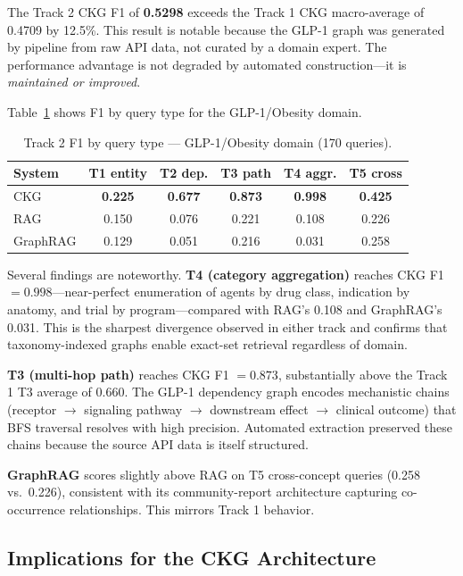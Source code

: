 The Track 2 CKG F1 of \textbf{0.5298} exceeds the Track 1 CKG
macro-average of 0.4709 by 12.5\%. This result is notable because the
GLP-1 graph was generated by pipeline from raw API data, not curated by
a domain expert. The performance advantage is not degraded by automated
construction---it is \textit{maintained or improved}.

Table~\ref{tab:track2-by-type} shows F1 by query type for the
GLP-1/Obesity domain.

\begin{table}[htbp]
\centering
\caption{Track 2 F1 by query type --- GLP-1/Obesity domain (170 queries).}
\label{tab:track2-by-type}
\begin{tabular}{lccccc}
\toprule
\textbf{System} & \textbf{T1 entity} & \textbf{T2 dep.} & \textbf{T3 path} &
  \textbf{T4 aggr.} & \textbf{T5 cross} \\
\midrule
CKG      & \textbf{0.225} & \textbf{0.677} & \textbf{0.873} & \textbf{0.998} & \textbf{0.425} \\
RAG      & 0.150 & 0.076 & 0.221 & 0.108 & 0.226 \\
GraphRAG & 0.129 & 0.051 & 0.216 & 0.031 & 0.258 \\
\bottomrule
\end{tabular}
\end{table}

Several findings are noteworthy. \textbf{T4 (category aggregation)} reaches
CKG F1 $= 0.998$---near-perfect enumeration of agents by drug class,
indication by anatomy, and trial by program---compared with RAG's 0.108
and GraphRAG's 0.031. This is the sharpest divergence observed in either
track and confirms that taxonomy-indexed graphs enable exact-set retrieval
regardless of domain.

\textbf{T3 (multi-hop path)} reaches CKG F1 $= 0.873$, substantially above
the Track 1 T3 average of 0.660. The GLP-1 dependency graph encodes
mechanistic chains (receptor $\to$ signaling pathway $\to$ downstream
effect $\to$ clinical outcome) that BFS traversal resolves with high
precision. Automated extraction preserved these chains because the
source API data is itself structured.

\textbf{GraphRAG} scores slightly above RAG on T5 cross-concept queries
(0.258 vs.\ 0.226), consistent with its community-report architecture
capturing co-occurrence relationships. This mirrors Track 1 behavior.

\subsection{Implications for the CKG Architecture}

